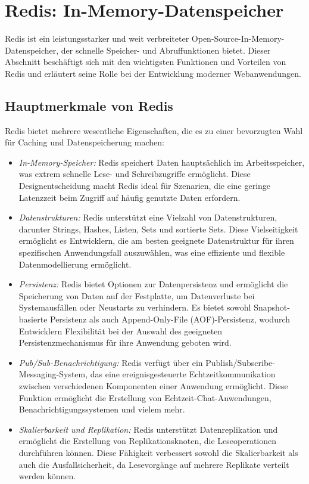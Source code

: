 \section{Redis: In-Memory-Datenspeicher}
Redis ist ein leistungsstarker und weit verbreiteter Open-Source-In-Memory-Datenspeicher, der schnelle Speicher- und Abruffunktionen bietet. Dieser Abschnitt beschäftigt sich mit den wichtigsten Funktionen und Vorteilen von Redis und erläutert seine Rolle bei der Entwicklung moderner Webanwendungen.
\subsection{Hauptmerkmale von Redis}
Redis bietet mehrere wesentliche Eigenschaften, die es zu einer bevorzugten Wahl für Caching und Datenspeicherung machen:
\begin{itemize}
    \item \emph{In-Memory-Speicher:} Redis speichert Daten hauptsächlich im Arbeitsspeicher, was extrem schnelle Lese- und Schreibzugriffe ermöglicht. Diese Designentscheidung macht Redis ideal für Szenarien, die eine geringe Latenzzeit beim Zugriff auf häufig genutzte Daten erfordern.
    \item \emph{Datenstrukturen:} Redis unterstützt eine Vielzahl von Datenstrukturen, darunter Strings, Hashes, Listen, Sets und sortierte Sets. Diese Vielseitigkeit ermöglicht es Entwicklern, die am besten geeignete Datenstruktur für ihren spezifischen Anwendungsfall auszuwählen, was eine effiziente und flexible Datenmodellierung ermöglicht.
    \item \emph{Persistenz:} Redis bietet Optionen zur Datenpersistenz und ermöglicht die Speicherung von Daten auf der Festplatte, um Datenverluste bei Systemausfällen oder Neustarts zu verhindern. Es bietet sowohl Snapshot-basierte Persistenz als auch Append-Only-File (AOF)-Persistenz, wodurch Entwicklern Flexibilität bei der Auswahl des geeigneten Persistenzmechanismus für ihre Anwendung geboten wird.
    \item \emph{Pub/Sub-Benachrichtigung:} Redis verfügt über ein Publish/Subscribe-Messaging-System, das eine ereignisgesteuerte Echtzeitkommunikation zwischen verschiedenen Komponenten einer Anwendung ermöglicht. Diese Funktion ermöglicht die Erstellung von Echtzeit-Chat-Anwendungen, Benachrichtigungssystemen und vielem mehr.
    \item \emph{Skalierbarkeit und Replikation:} Redis unterstützt Datenreplikation und ermöglicht die Erstellung von Replikationsknoten, die Leseoperationen durchführen können. Diese Fähigkeit verbessert sowohl die Skalierbarkeit als auch die Ausfallsicherheit, da Lesevorgänge auf mehrere Replikate verteilt werden können.
\end{itemize}